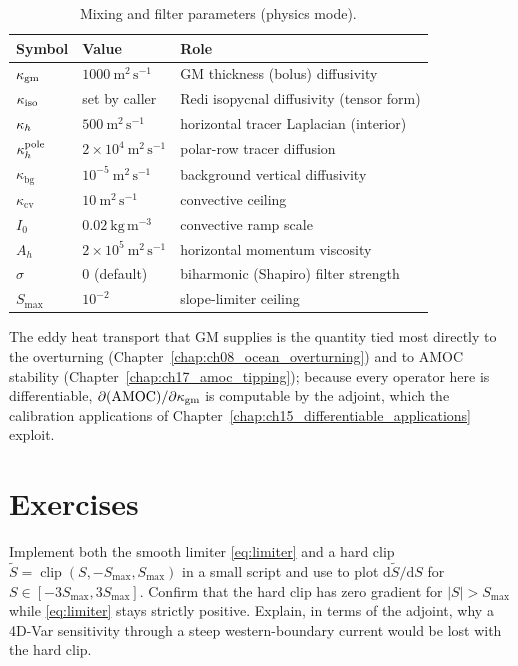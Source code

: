 \begin{table}[ht]
\centering
\caption{Mixing and filter parameters (physics mode).}
\label{tab:mix-params}
\begin{tabular}{lll}
\toprule
Symbol & Value & Role \\
\midrule
$\kappa_{\mathrm{gm}}$ & $1000\ \mathrm{m^2\,s^{-1}}$ & GM thickness (bolus) diffusivity \\
$\kappa_{\mathrm{iso}}$ & set by caller & Redi isopycnal diffusivity (tensor form) \\
$\kappa_{h}$ & $500\ \mathrm{m^2\,s^{-1}}$ & horizontal tracer Laplacian (interior) \\
$\kappa_{h}^{\mathrm{pole}}$ & $2\times10^4\ \mathrm{m^2\,s^{-1}}$ & polar-row tracer diffusion \\
$\kappa_{\mathrm{bg}}$ & $10^{-5}\ \mathrm{m^2\,s^{-1}}$ & background vertical diffusivity \\
$\kappa_{\mathrm{cv}}$ & $10\ \mathrm{m^2\,s^{-1}}$ & convective ceiling \\
$I_0$ & $0.02\ \mathrm{kg\,m^{-3}}$ & convective ramp scale \\
$A_h$ & $2\times10^5\ \mathrm{m^2\,s^{-1}}$ & horizontal momentum viscosity \\
$\sigma$ & $0$ (default) & biharmonic (Shapiro) filter strength \\
$S_{\max}$ & $10^{-2}$ & slope-limiter ceiling \\
\bottomrule
\end{tabular}
\end{table}

The eddy heat transport that GM supplies is the quantity tied most directly to the
overturning (Chapter~\ref{chap:ch08_ocean_overturning}) and to AMOC stability
(Chapter~\ref{chap:ch17_amoc_tipping}); because every operator here is
differentiable, $\partial(\text{AMOC})/\partial\kappa_{\mathrm{gm}}$ is computable by the adjoint,
which the calibration applications of Chapter~\ref{chap:ch15_differentiable_applications}
exploit.

\section*{Exercises}

\begin{exercise}
Implement both the smooth limiter \eqref{eq:limiter} and a hard clip
$\widetilde S=\operatorname{clip}(S,-S_{\max},S_{\max})$ in a small \jax{} script and use
 to plot $\mathrm{d}\widetilde S/\mathrm{d}S$ for $S\in[-3S_{\max},3S_{\max}]$.
Confirm that the hard clip has zero gradient for $|S|>S_{\max}$ while
\eqref{eq:limiter} stays strictly positive. Explain, in terms of the adjoint, why a
4D-Var sensitivity through a steep western-boundary current would be lost with the hard clip.
\end{exercise}

